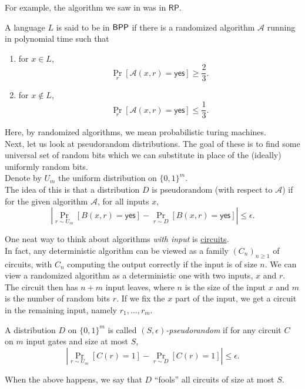		For example, the algorithm we saw in  was in $\mathsf{RP}$.

		\begin{fdef}[$\BPP$]
			A language $L$ is said to be in $\BPP$ if there is a randomized algorithm $\mathcal{A}$ running in polynomial time such that
			\begin{enumerate}
				\item for $x \in L$,
				\[ \Pr_{r} \left[\mathcal{A}(x,r) = \mathsf{yes}\right] \ge \frac{2}{3}. \]
				\item for $x \not\in L$,
				\[ \Pr_{r} \left[\mathcal{A}(x,r) = \mathsf{yes}\right] \le \frac{1}{3}. \]
			\end{enumerate}
		\end{fdef}
		
		Here, by randomized algorithms, we mean probabilistic turing machines.\\

		Next, let us look at pseudorandom distributions. The goal of these is to find some universal set of random bits which we can substitute in place of the (ideally) uniformly random bits. \\
		Denote by $U_m$ the uniform distribution on $\{0,1\}^m$.\\
		The idea of this is that a distribution $D$ is pseudorandom (with respect to $\mathcal{A}$) if for the given algorithm $\mathcal{A}$, for all inputs $x$,
		\[ \left| \Pr_{r \sim U_m}[ B(x,r) = \mathsf{yes}] - \Pr_{r \sim D}[ B(x,r) = \mathsf{yes} ] \right| \le \epsilon. \]

		One neat way to think about algorithms \emph{with input} is \href{https://en.wikipedia.org/wiki/Boolean_circuit}{circuits}.\\
		In fact, any deterministic algorithm can be viewed as a family $(C_n)_{n \ge 1}$ of circuits, with $C_n$ computing the output correctly if the input is of size $n$. We can view a randomized algorithm as a deterministic one with two inputs, $x$ and $r$. The circuit then has $n+m$ input leaves, where $n$ is the size of the input $x$ and $m$ is the number of random bits $r$. If we fix the $x$ part of the input, we get a circuit in the remaining input, namely $r_1,\ldots,r_m$.

		\begin{fdef}
			A distribution $D$ on $\{0,1\}^m$ is called \emph{$(S,\epsilon)$-pseudorandom} if for any circuit $C$ on $m$ input gates and size at most $S$,
			\[ \left| \Pr_{r \sim U_m} [ C(r) = 1 ] - \Pr_{r \sim D} [C(r) = 1] \right| \le \epsilon. \]
		\end{fdef}
		When the above happens, we say that $D$ ``fools'' all circuits of size at most $S$. %

